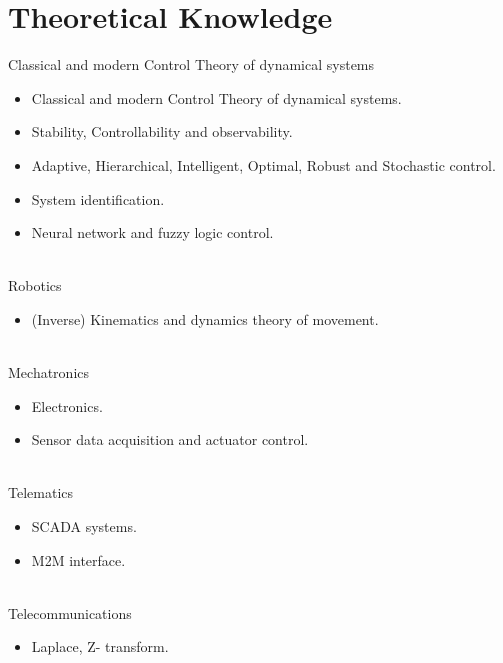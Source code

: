 \documentclass[letterpaper]{engineer_cv} %
\begin{document}
        \clearpage

	\infographics


	\section{Theoretical Knowledge}

	\begin{longList} %
		\longListItem
			{}
			{}
			{Classical and modern Control Theory of dynamical systems}
			{}
			{}
			{\begin{itemize}
				\item Classical and modern Control Theory of dynamical systems.
				\item Stability, Controllability and observability.
				\item Adaptive, Hierarchical, Intelligent, Optimal, Robust and Stochastic control.
				\item System identification.
				\item Neural network and fuzzy logic control.
			\end{itemize}}
			\\
		\longListItem
			{}
			{}
			{Robotics}
			{}
			{}
			{\begin{itemize}
				\item (Inverse) Kinematics and dynamics theory of movement.
			\end{itemize}}
			\\
		\longListItem
			{}
			{}
			{Mechatronics}
			{}
			{}
			{\begin{itemize}
				\item Electronics.
				\item Sensor data acquisition and actuator control.
			\end{itemize}}
			\\
		\longListItem
			{}
			{}
			{Telematics}
			{}
			{}
			{\begin{itemize}
				\item SCADA systems.
				\item M2M interface.
			\end{itemize}}
			\\
		\longListItem
			{}
			{}
			{Telecommunications}
			{}
			{}
			{\begin{itemize}
				\item Laplace, Z- transform.
			\end{itemize}}
			\\
	\end{longList}
\end{document}
